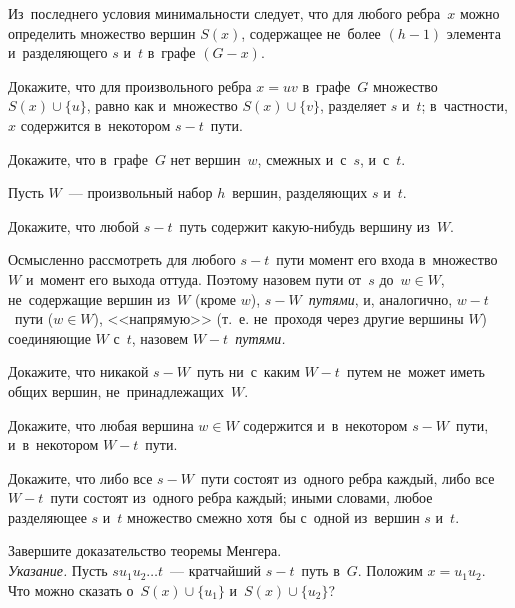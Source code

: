 Из~последнего условия минимальности следует, что для любого ребра~$x$ можно
определить множество вершин $S(x)$, содержащее не~более $(h - 1)$ элемента
и~разделяющего $s$ и~$t$ в~графе $(G - x)$.

\begin{problems}

\item
Докажите, что для произвольного ребра $x = u v$ в~графе~$G$ множество
$S(x) \cup \{u\}$, равно как и~множество $S(x) \cup \{v\}$, разделяет
$s$ и~$t$; в~частности, $x$ содержится в~некотором $s {-} t$~пути.

\item
Докажите, что в~графе~$G$ нет вершин~$w$, смежных и~с~$s$, и~с~$t$.

\end{problems}

Пусть $W$~--- произвольный набор $h$~вершин, разделяющих $s$ и~$t$.

\begin{problems}

\item
Докажите, что любой $s {-} t$~путь содержит какую-нибудь вершину из~$W$.

\end{problems}

Осмысленно рассмотреть для любого $s {-} t$~пути момент его входа
в~множество~$W$ и~момент его выхода оттуда.
Поэтому назовем пути от~$s$ до~$w \in W$, не~содержащие вершин из~$W$
(кроме $w$), \emph{$s {-} W$~путями},
и, аналогично, $w {-} t$~пути ($w \in W$), <<напрямую>> (т.~е. не~проходя
через другие вершины $W$) соединяющие $W$ с~$t$, назовем
\emph{$W \! {-} t$~путями.}

\begin{problems}

\item
Докажите, что никакой $s {-} W$~путь ни~с~каким $W \! {-} t$~путем не~может
иметь общих вершин, не~принадлежащих~$W$.

\item
Докажите, что любая вершина $w \in W$ содержится и~в~некотором $s {-} W$~пути,
и~в~некотором $W \! {-} t$~пути.

\item
Докажите, что либо все $s {-} W$~пути состоят из~одного ребра каждый, либо все
$W \! {-} t$~пути состоят из~одного ребра каждый;
иными словами, любое разделяющее $s$ и~$t$ множество смежно хотя~бы с~одной
из~вершин $s$ и~$t$.

\item
Завершите доказательство теоремы Менгера.
\\
\emph{Указание.}
Пусть $s u_1 u_2 \ldots t$~--- кратчайший $s {-} t$~путь в~$G$.
Положим $x = u_1 u_2$.
Что можно сказать о~$S(x) \cup \{u_1\}$ и~$S(x) \cup \{u_2\}$?

\end{problems}

